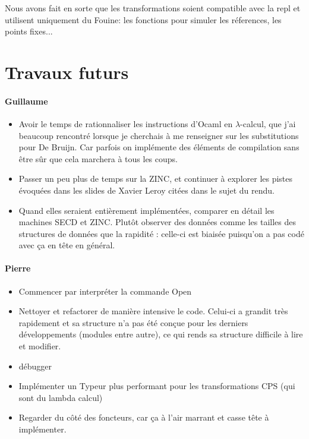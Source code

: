 \documentclass[paper=a4, fontsize=11pt, twocolumn]{article}
\begin{document}
Nous avons fait en sorte que les transformations soient compatible avec la repl et utilisent uniquement du Fouine: les fonctions pour simuler les réferences, les points fixes...




\section{Travaux futurs}
\paragraph{Guillaume}
\begin{itemize}
	\item Avoir le temps de rationnaliser les instructions d'Ocaml en $\lambda$-calcul, que j'ai beaucoup rencontré lorsque je cherchais à me renseigner sur les substitutions pour De Bruijn. Car parfois on implémente des éléments de compilation sans être sûr que cela marchera à tous les coups.
	
	\item Passer un peu plus de temps sur la ZINC, et continuer à explorer les pistes évoquées dans les slides de Xavier Leroy citées dans le sujet du rendu.
	
	\item Quand elles seraient entièrement implémentées, comparer en détail les machines SECD et ZINC. Plutôt observer des données comme les tailles des structures de données que la rapidité : celle-ci est biaisée puisqu'on a pas codé avec ça en tête en général.
\end{itemize}

\paragraph{Pierre}
\begin{itemize}
	\item Commencer par interpréter la commande Open
	\item Nettoyer et refactorer de manière intensive le code. Celui-ci a grandit très rapidement et sa structure n'a pas été conçue pour les derniers développements (modules entre autre), ce qui rends sa structure difficile à lire et modifier.
	\item débugger
	\item Implémenter un Typeur plus performant pour les transformations CPS (qui sont du lambda calcul)
	\item Regarder du côté des foncteurs, car ça à l'air marrant et casse tête à implémenter.
\end{itemize}
\end{document}

